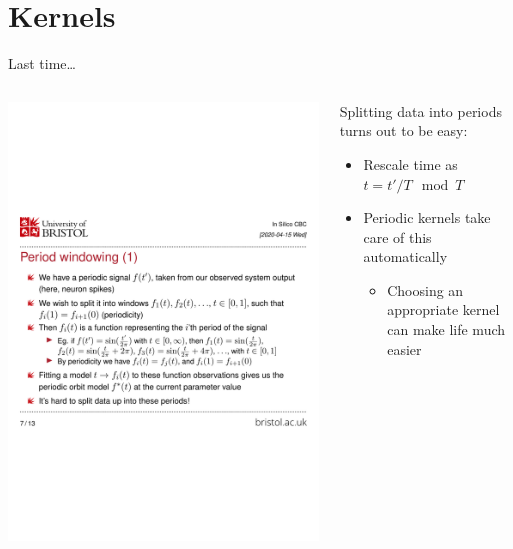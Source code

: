 \documentclass[presentation]{beamer}
\begin{document}
\section{Kernels}
\label{sec:org0262886}
\begin{frame}[label={sec:orgb0a4e3b}]{Last time\ldots{}}
\begin{columns}
\begin{column}{0.6\columnwidth}
\begin{center}
\includegraphics[trim={0cm 10cm 0cm 10cm},width=.9\linewidth]{./slide.pdf}
\end{center}
\end{column}

\begin{column}{0.4\columnwidth}
Splitting data into periods turns out to be easy:

\begin{itemize}
\item Rescale time as \(t = t' / T \mod T\)
\item Periodic kernels take care of this automatically
\begin{itemize}
\item Choosing an appropriate kernel can make life much easier
\end{itemize}
\end{itemize}
\end{column}
\end{columns}
\end{frame}
\end{document}

